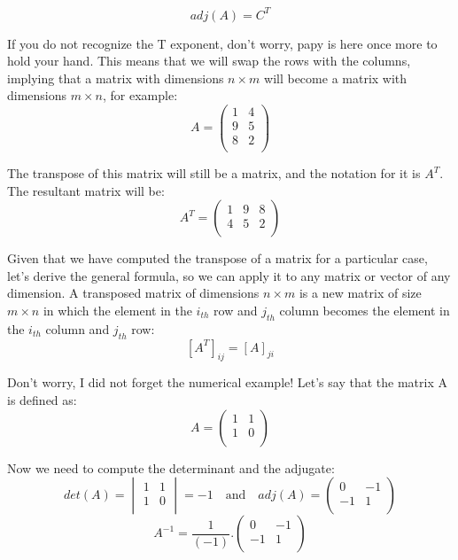 \documentclass[a4,12pt,twosided,openany]{memoir}
\begin{document}
\[adj(A) = C^T\]
\par 
\indent
If you do not recognize the T exponent, don’t worry, papy is here once more to hold your hand. This means that we will swap the rows with the columns, implying that a matrix with dimensions $n \times m$ will become a matrix with dimensions $m \times n$, for example:
\[A =
\begin{pmatrix}
1 & 4 \\
9 & 5  \\
8 & 2  \\
\end{pmatrix}
\]
\par 
\indent
The transpose of this matrix will still be a matrix, and the notation for it is $A^T$. The resultant matrix will be:
\[A^T = \begin{pmatrix}
1 & 9 & 8  \\
4 & 5 & 2  \\
\end{pmatrix}
\]
\par 
\indent
Given that we have computed the transpose of a matrix for a particular case, let’s derive the general formula, so we can apply it to any matrix or vector of any dimension. A transposed matrix of dimensions $n \times m$ is a new matrix of size $m \times n$ in which the element in the $i_{th}$ row and $j_{th}$ column becomes the element in the $i_{th}$ column and $j_{th}$ row:
\[\left[ A^T \right]_{ij} =  \left[A \right]_{ji}\]
\par 
\indent
Don’t worry, I did not forget the numerical example! Let’s say that the matrix A is defined as:
\[A = 
\begin{pmatrix}
1 & 1 \\
1 & 0 \\
\end{pmatrix}
\]
\par 
\indent
Now we need to compute the determinant and the adjugate:
\[
det(A) = 
\begin{vmatrix}
1 & 1 \\
1 & 0 \\
\end{vmatrix} = -1
\quad \textrm{and} \quad  adj(A) = \begin{pmatrix}
0 & -1 \\
-1 & 1 \\
\end{pmatrix}
\]
\[
A^{-1} =  \frac{1}{(-1)}.\begin{pmatrix}
0 & -1 \\
-1 & 1 \\
\end{pmatrix}
\]
\end{document}
